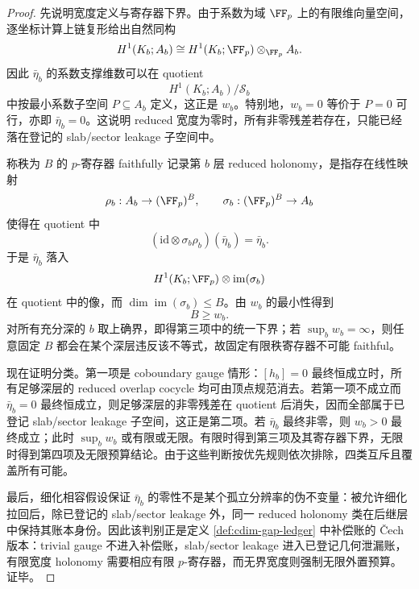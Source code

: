 \begin{proof}
先说明宽度定义与寄存器下界。由于系数为域 \(\FF_p\) 上的有限维向量空间，逐坐标计算上链复形给出自然同构
\[
H^1(K_b;A_b)\cong H^1(K_b;\FF_p)\otimes_{\FF_p}A_b.
\]
因此 \(\bar\eta_b\) 的系数支撑维数可以在 quotient
\[
H^1(K_b;A_b)/\mathcal S_b
\]
中按最小系数子空间 \(P\subseteq A_b\) 定义，这正是 \(w_b\)。特别地，\(w_b=0\) 等价于 \(P=0\) 可行，亦即 \(\bar\eta_b=0\)。这说明 reduced 宽度为零时，所有非零残差若存在，只能已经落在登记的 slab/sector leakage 子空间中。

称秩为 \(B\) 的 \(p\)-寄存器 faithfully 记录第 \(b\) 层 reduced holonomy，是指存在线性映射
\[
\rho_b:A_b\to (\FF_p)^B,\qquad
\sigma_b:(\FF_p)^B\to A_b
\]
使得在 quotient 中
\[
(\mathrm{id}\otimes \sigma_b\rho_b)(\bar\eta_b)=\bar\eta_b.
\]
于是 \(\bar\eta_b\) 落入
\[
H^1(K_b;\FF_p)\otimes \operatorname{im}(\sigma_b)
\]
在 quotient 中的像，而 \(\dim\operatorname{im}(\sigma_b)\le B\)。由 \(w_b\) 的最小性得到
\[
B\ge w_b.
\]
对所有充分深的 \(b\) 取上确界，即得第三项中的统一下界；若 \(\sup_b w_b=\infty\)，则任意固定 \(B\) 都会在某个深层违反该不等式，故固定有限秩寄存器不可能 faithful。

现在证明分类。第一项是 coboundary gauge 情形：\([h_b]=0\) 最终恒成立时，所有足够深层的 reduced overlap cocycle 均可由顶点规范消去。若第一项不成立而 \(\bar\eta_b=0\) 最终恒成立，则足够深层的非零残差在 quotient 后消失，因而全部属于已登记 slab/sector leakage 子空间，这正是第二项。若 \(\bar\eta_b\) 最终非零，则 \(w_b>0\) 最终成立；此时 \(\sup_b w_b\) 或有限或无限。有限时得到第三项及其寄存器下界，无限时得到第四项及无限预算结论。由于这些判断按优先规则依次排除，四类互斥且覆盖所有可能。

最后，细化相容假设保证 \(\bar\eta_b\) 的零性不是某个孤立分辨率的伪不变量：被允许细化拉回后，除已登记的 slab/sector leakage 外，同一 reduced holonomy 类在后继层中保持其账本身份。因此该判别正是定义 \ref{def:cdim-gap-ledger} 中补偿账的 \v Cech 版本：trivial gauge 不进入补偿账，slab/sector leakage 进入已登记几何泄漏账，有限宽度 holonomy 需要相应有限 \(p\)-寄存器，而无界宽度则强制无限外置预算。证毕。
\end{proof}

